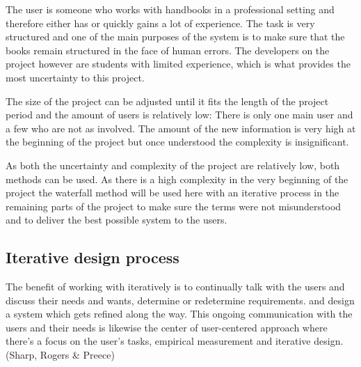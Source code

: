 The user is someone who works with handbooks in a professional setting and therefore either has or quickly gains a lot of experience. The task is very structured and one of the main purposes of the system is to make sure that the books remain structured in the face of human errors. The developers on the project however are students with limited experience, which is what provides the most uncertainty to this project. %

The size of the project can be adjusted until it fits the length of the project period and the amount of users is relatively low: There is only one main user and a few who are not as involved. The amount of the new information is very high at the beginning of the project but once understood the complexity is insignificant.

As both the uncertainty and complexity of the project are relatively low, both methods can be used. As there is a high complexity in the very beginning of the project the waterfall method will be used here with an iterative process in the remaining parts of the project to make sure the terms were not misunderstood and to deliver the best possible system to the users. %


\subsection{Iterative design process} \label{sec:iterativ}
The benefit of working with iteratively is to continually talk with the users and discuss their needs and wants, determine or redetermine requirements. and design a system which gets refined along the way. This ongoing communication with the users and their needs is likewise the center of user-centered approach where there’s a focus on the user’s tasks, empirical measurement and iterative design. (Sharp, Rogers \& Preece)


